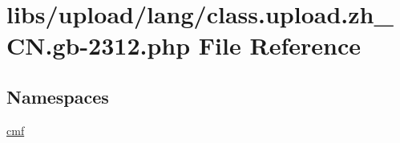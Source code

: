 \hypertarget{class_8upload_8zh___c_n_8gb-2312_8php}{}\section{libs/upload/lang/class.upload.\+zh\+\_\+\+C\+N.\+gb-\/2312.php File Reference}
\label{class_8upload_8zh___c_n_8gb-2312_8php}
\subsection*{Namespaces}
\begin{DoxyCompactItemize}
\item 
 \hyperlink{namespacecmf}{cmf}
\end{DoxyCompactItemize}
